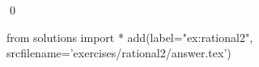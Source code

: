 
\begin{ex} 
  \label{ex:rational2}
  
  \qed
\end{ex} 
\begin{python0}
from solutions import *
add(label="ex:rational2",
    srcfilename='exercises/rational2/answer.tex') 
\end{python0}
